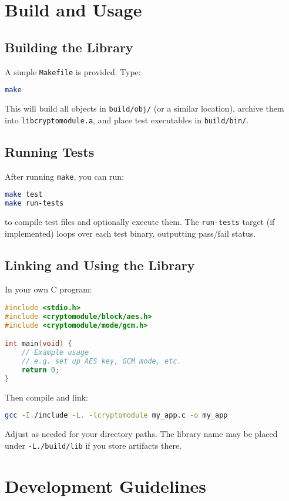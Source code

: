 \documentclass[12pt,a4paper]{article}
\begin{document}
\section{Build and Usage}
\label{sec:build-usage}

\subsection{Building the Library}
A simple \texttt{Makefile} is provided. Type:
\begin{lstlisting}[language=bash]
make
\end{lstlisting}
This will build all objects in \texttt{build/obj/} (or a similar location), archive them into \texttt{libcryptomodule.a}, and place test executables in \texttt{build/bin/}.

\subsection{Running Tests}
After running \texttt{make}, you can run:
\begin{lstlisting}[language=bash]
make test
make run-tests
\end{lstlisting}
to compile test files and optionally execute them. The \texttt{run-tests} target (if implemented) loops over each test binary, outputting pass/fail status.

\subsection{Linking and Using the Library}
In your own C program:
\begin{lstlisting}[language=C]
#include <stdio.h>
#include <cryptomodule/block/aes.h>
#include <cryptomodule/mode/gcm.h>

int main(void) {
    // Example usage
    // e.g. set up AES key, GCM mode, etc.
    return 0;
}
\end{lstlisting}
Then compile and link:
\begin{lstlisting}[language=bash]
gcc -I./include -L. -lcryptomodule my_app.c -o my_app
\end{lstlisting}
Adjust as needed for your directory paths. The library name may be placed under \texttt{-L./build/lib} if you store artifacts there.

\section{Development Guidelines}
\label{sec:dev-guidelines}
\end{document}
